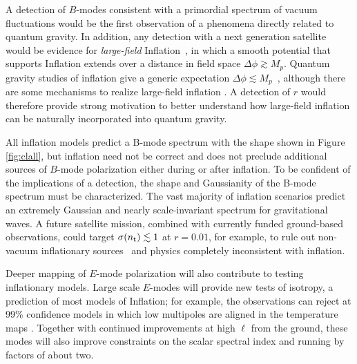 A detection of $B$-modes consistent with a primordial spectrum of vacuum fluctuations would be the first observation 
of a phenomena directly related to quantum gravity. In addition, any detection with a next generation satellite would be 
evidence for {\it large-field} Inflation~\cite{Lyth:1996im}, in which a smooth potential that supports Inflation extends over 
a distance in field space $\Delta\phi \gtrsim M_p$. Quantum gravity studies of inflation give a generic expectation $\Delta\phi \lesssim M_p$~\cite{Banks:2003sx,Baumann:2014nda,Brown:2015iha,Rudelius:2015xta}, although 
there are some mechanisms to realize large-field inflation \cite{Silverstein:2008sg,Kaloper:2008fb,Marchesano:2014mla,Blumenhagen:2015xpa}. A detection of $r$ would therefore provide strong 
motivation to better understand how large-field inflation can be naturally incorporated into quantum gravity. 

All inflation models predict a B-mode spectrum with the shape shown in Figure \ref{fig:clall}, but inflation 
need not be correct \cite{Khoury:2001bz,Brandenberger:2012zb,Ijjas:2015hcc} and does not preclude additional sources of $B$-mode polarization either during or after 
inflation. To be confident of the implications of a detection, the shape and Gaussianity of the B-mode spectrum 
must be characterized. The vast majority of inflation scenarios predict an extremely Gaussian and nearly scale-invariant spectrum for 
gravitational waves. A future satellite mission, combined with currently funded ground-based observations, 
could target $\sigma(n_{\rm t})\lesssim1$ at $r=0.01$, for example, to rule out non-vacuum 
inflationary sources~\cite{Namba:2015gja,Peloso:2016gqs} and physics completely inconsistent with inflation. 

Deeper mapping of $E$-mode polarization will also contribute to testing inflationary models. Large scale $E$-modes will provide new tests of isotropy, a prediction of most models of Inflation;  
for example, the observations can reject at 99\% confidence models in which low multipoles are aligned in the temperature maps \cite{Dvorkin:2007jp}. Together with continued improvements at high $\ell$ from the ground, these modes will also improve constraints on the scalar spectral index and running by factors of about two.  

